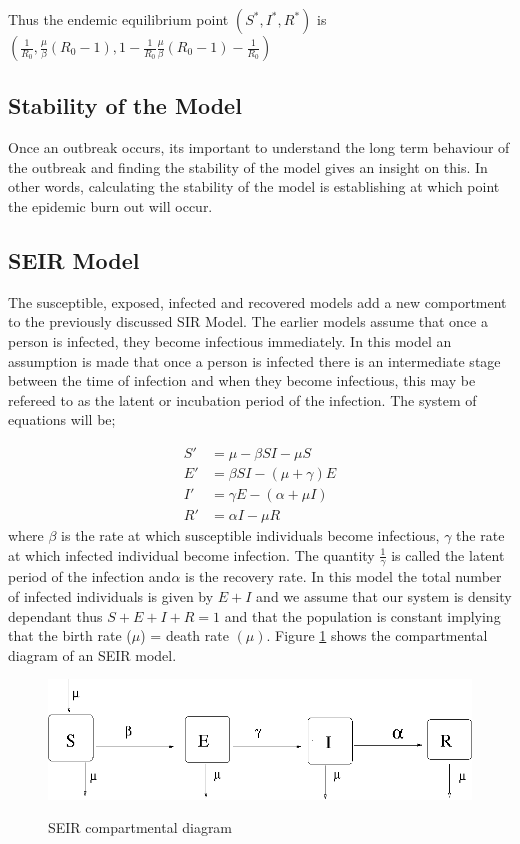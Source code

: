  Thus the endemic equilibrium point $( S^*,I^*,R^*)$ is 
 $\left( \frac{1}{R_0}, \frac{\mu}{\beta} (R_0 -1), 1 -  \frac{1}{R_0} \frac{\mu}{\beta} (R_0 -1) - \frac{1}{R_0} \right)$
 
 
  \subsection{Stability of the Model}
 Once an outbreak occurs, its important to understand the long term behaviour of the outbreak and finding the stability of the model gives an insight on this. In other words, calculating the stability of the model is establishing at which point the epidemic burn out will occur.
 \subsection{SEIR Model}
The susceptible, exposed, infected and recovered models add a new comportment to the previously discussed SIR Model. The earlier models assume that once a person is infected, they become infectious immediately. In this model an assumption is made that once a person is infected there is an intermediate stage between the time of infection and when they become infectious, this may be refereed to as the latent or incubation period of the infection. The system of equations will be;

\begin{align}
S'& = \mu -\beta S I - \mu S \label{5} \\
E' &= \beta S I - (\mu + \gamma) E  \label{6}\\
I' &= \gamma E - (\alpha + \mu I) \label{7}\\
R' &= \alpha I  - \mu R \label{8}
\end{align}
where $\beta$ is the rate at which susceptible individuals become infectious, $\gamma$ the rate at which infected individual become infection. The quantity $\frac{1}{\gamma}$ is called the latent period of the  infection and$\alpha$ is the recovery rate.
In this model the total number of infected individuals is given by $E +I$ and  we assume that our system is density dependant thus $S + E + I + R = 1$ and  that the population is constant implying that the birth rate ($\mu$)  = death rate $(\mu)$. Figure \ref{fig 4.2} shows the compartmental diagram of an SEIR model.
\begin{figure}[h!]
 
 \centering
 \includegraphics[scale=0.5]{images/seir.png}\label{fig 4.2}
 \caption{SEIR compartmental diagram}
 \end{figure}
  
